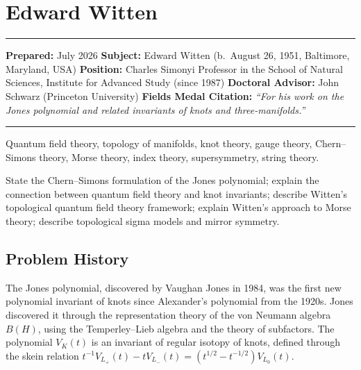 \chapter{Edward Witten}\label{ch1990edwardwitten:edward-witten-fields-medal-1990-a-comprehensive-report}

\begin{center}\rule{0.5\linewidth}{0.5pt}\end{center}

\textbf{Prepared:} July 2026 \textbf{Subject:} Edward Witten (b.~August 26, 1951, Baltimore, Maryland, USA) \textbf{Position:} Charles Simonyi Professor in the School of Natural Sciences, Institute for Advanced Study (since 1987) \textbf{Doctoral Advisor:} John Schwarz (Princeton University) \textbf{Fields Medal Citation:} \emph{``For his work on the Jones polynomial and related invariants of knots and three-manifolds.''}

\begin{center}\rule{0.5\linewidth}{0.5pt}\end{center}

\begin{prereqs} Quantum field theory, topology of manifolds, knot theory, gauge theory, Chern--Simons theory, Morse theory, index theory, supersymmetry, string theory. \end{prereqs}

\begin{objectives} State the Chern--Simons formulation of the Jones polynomial; explain the connection between quantum field theory and knot invariants; describe Witten's topological quantum field theory framework; explain Witten's approach to Morse theory; describe topological sigma models and mirror symmetry. \end{objectives}

\section{Problem History}

The Jones polynomial, discovered by Vaughan Jones in 1984, was the first new polynomial invariant of knots since Alexander's polynomial from the 1920s. Jones discovered it through the representation theory of the von Neumann algebra $B(H)$, using the Temperley--Lieb algebra and the theory of subfactors. The polynomial $V_K(t)$ is an invariant of regular isotopy of knots, defined through the skein relation $t^{-1}V_{L_+}(t) - tV_{L_-}(t) = (t^{1/2} - t^{-1/2})V_{L_0}(t)$.

